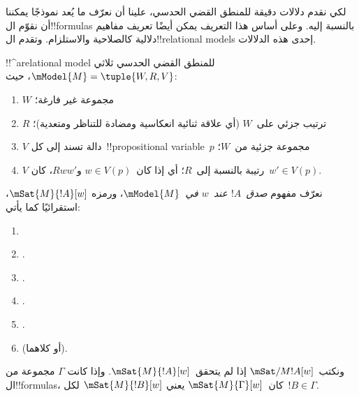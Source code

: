 \documentclass[../../../include/open-logic-section]{subfiles}
\begin{document}


لكي نقدم دلالات دقيقة للمنطق القضي الحدسي، علينا أن نعرّف ما يُعد نموذجًا
يمكننا أن نقوّم ال!!{formula}s بالنسبة إليه. وعلى أساس هذا التعريف يمكن
أيضًا تعريف مفاهيم دلالية كالصلاحية والاستلزام. وتقدم ال!!{relational
  model}s إحدى هذه الدلالات.

\begin{defn}
  !!^a{relational model} للمنطق القضي الحدسي ثلاثي
  $\mModel{M}=\tuple{W,R,V}$، حيث:
  \begin{enumerate}
  \item $W$ مجموعة غير فارغة؛
  \item $R$ ترتيب جزئي على~$W$ (أي علاقة ثنائية انعكاسية ومضادة للتناظر
    ومتعدية)؛
  \item $V$ دالة تسند إلى كل~!!{propositional
    variable}~$p$ مجموعة جزئية من~$W$؛
  \item $V$ رتيبة بالنسبة إلى~$R$؛ أي إذا كان~$w \in V(p)$ و$Rww'$،
    كان~$w' \in V(p)$.
  \end{enumerate}
\end{defn}

\begin{defn}
  نعرّف مفهوم \emph{صدق~$!A$ عند~$w$ في~$\mModel{M}$}، ورمزه
  $\mSat{M}{!A}[w]$، استقرائيًا كما يأتي:
  \begin{enumerate}
  \item {}
  \item {}.
  \item {}.
  \item {}.
  \item {}.
  \item {} (أو كلاهما).
  \end{enumerate}
  ونكتب~$\mSat/{M}{!A}[w]$ إذا لم يتحقق~$\mSat{M}{!A}[w]$. وإذا كانت
  $\Gamma$ مجموعة من ال!!{formula}s، كان~$\mSat{M}{\Gamma}[w]$ يعني
  $\mSat{M}{!B}[w]$ لكل~$!B \in \Gamma$.
\end{defn}
\end{document}
